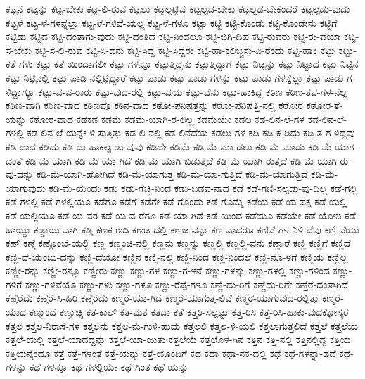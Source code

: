 {ಕಟ್ಟನೆ
ಕಟ್ಟನ್ನು
ಕಟ್ಟ-ಬೇಕು
ಕಟ್ಟ-ಲಿ-ರುವ
ಕಟ್ಟಲು
ಕಟ್ಟಲ್ಪಟ್ಟಿವೆ
ಕಟ್ಟಲ್ಪಡ-ಬೇಕು
ಕಟ್ಟಲ್ಪಡ-ಬೇಕೆಂದರೆ
ಕಟ್ಟಲ್ಪಡು-ವುದು
ಕಟ್ಟಳೆ
ಕಟ್ಟ-ಳೆ-ಗಳನ್ನೆಲ್ಲಾ
ಕಟ್ಟ-ಳೆ-ಗಳಿವೆ-ಯಲ್ಲ
ಕಟ್ಟ-ಳೆ-ಗಳೂ
ಕಟ್ಟಾ
ಕಟ್ಟಿ
ಕಟ್ಟಿ-ಕೊಂಡು
ಕಟ್ಟಿ-ಕೊಂಡೇನು
ಕಟ್ಟಿಗೆ
ಕಟ್ಟಿಡು
ಕಟ್ಟಿದ
ಕಟ್ಟಿ-ದಂತಾಗು-ವುದು
ಕಟ್ಟಿ-ದಂತಿದೆ
ಕಟ್ಟಿ-ನಿಂದಲೂ
ಕಟ್ಟಿ-ಬಿಗಿ-ದಿಹ
ಕಟ್ಟಿ-ರುವರು
ಕಟ್ಟಿ-ರು-ವೆಯಾ
ಕಟ್ಟಿ-ಸ-ಬೇಕು
ಕಟ್ಟಿ-ಸ-ಲಿ-ರುವ
ಕಟ್ಟಿ-ಸಿ-ದನು
ಕಟ್ಟಿ-ಸಿದ್ದ
ಕಟ್ಟಿ-ಸಿದ್ದರು
ಕಟ್ಟಿ-ಹಾ-ಕಲಿಚ್ಚಿಸು-ವಿ-ರೆಂದು
ಕಟ್ಟಿ-ಹಾಕಿ
ಕಟ್ಟು
ಕಟ್ಟು-ಕತೆ-ಗಳು
ಕಟ್ಟು-ಕತೆ-ಯಿಂದಾಗಲೀ
ಕಟ್ಟು-ಗಳನ್ನೂ
ಕಟ್ಟುತ್ತಿದ್ದನು
ಕಟ್ಟುತ್ತಿದ್ದಾಗ
ಕಟ್ಟು-ನಿಟ್ಟನ್ನು
ಕಟ್ಟು-ನಿಟ್ಟಾದ
ಕಟ್ಟು-ನಿಟ್ಟಿನ
ಕಟ್ಟು-ನಿಟ್ಟಿನಲ್ಲಿ
ಕಟ್ಟು-ಪಾಡಿ-ನಲ್ಲಿಟ್ಟಿದ್ದಾರೆ
ಕಟ್ಟು-ಪಾಡು
ಕಟ್ಟು-ಪಾಡು-ಗಳನ್ನು
ಕಟ್ಟು-ಪಾಡು-ಗಳನ್ನೆಲ್ಲಾ
ಕಟ್ಟು-ಪಾಡು-ಗ-ಳಿದ್ದಾಗ್ಯೂ
ಕಟ್ಟು-ವ-ವ-ರಾರು
ಕಟ್ಟು-ವುದ-ರಲ್ಲಿ
ಕಟ್ಟು-ವುದು
ಕಟ್ಟು-ವೆನು
ಕಟ್ಟು-ಹಾಕಿದ್ದ
ಕಠಿಣ
ಕಠಿಣ-ತಪ-ಗಳ-ನೆಲ್ಲ
ಕಠಿಣ-ವಾಗಿ
ಕಠಿಣ-ವಾದ
ಕಠಿಣವೊ
ಕಠಿನ-ವಾದ
ಕಠೋ-ಪನಿಷತ್ತನ್ನು
ಕಠೋ-ಪನಿಷತ್ತಿ-ನಲ್ಲಿ
ಕಠೋರ
ಕಠೋರ-ತೆ-ಯನ್ನು
ಕಠೋರ-ವಾದ
ಕಡಕಡ
ಕಡಮೆ
ಕಡಮೆ-ಯಾಗಿ-ರ-ಲಿಲ್ಲ
ಕಡಮೆಯೇ
ಕಡಲ
ಕಡ-ಲಿನ-ಲೆ-ಗಳ
ಕಡ-ಲಿನ-ಲೆ-ಗಳಲ್ಲಿ
ಕಡ-ಲಿನ-ಲೆ-ಯನ್ನೇ-ಳಿ-ಸುತ್ತಿತ್ತು
ಕಡ-ಲಿ-ನಲ್ಲಿ
ಕಡ-ಲಿನೆದೆಯ
ಕಡಲು-ಗಳ
ಕಡಿ
ಕಡಿ-ಕ-ಡಿದು
ಕಡಿ-ತ-ಗ-ಳಿದ್ದವು
ಕಡಿ-ದಾದ
ಕಡಿದು
ಕಡಿ-ದು-ಹಾಕಲ್ಪ-ಡು-ವುವು
ಕಡಿದೇ
ಕಡಿಮೆ
ಕಡಿ-ಮೆ-ಮಾ-ಡಲು
ಕಡಿ-ಮೆ-ಮಾಡು
ಕಡಿ-ಮೆ-ಯಾಗ-ದಂತೆ
ಕಡಿ-ಮೆ-ಯಾಗಿ
ಕಡಿ-ಮೆ-ಯಾ-ಗಿದೆ
ಕಡಿ-ಮೆ-ಯಾಗಿ-ಬಿಡುತ್ತದೆ
ಕಡಿ-ಮೆ-ಯಾಗಿ-ರುತ್ತದೆ
ಕಡಿ-ಮೆ-ಯಾಗಿ-ರು-ವು-ದನ್ನು
ಕಡಿ-ಮೆ-ಯಾಗಿ-ಹೋಗಿದೆ
ಕಡಿ-ಮೆ-ಯಾಗುತ್ತ
ಕಡಿ-ಮೆ-ಯಾ-ಗುತ್ತಿದೆ
ಕಡಿ-ಮೆ-ಯಾಗುತ್ತಿವೆ
ಕಡಿ-ಮೆ-ಯಾಗುವುದು
ಕಡಿ-ಮೆ-ಯೆಂದು
ಕಡು
ಕಡು-ಗೆಚ್ಚಿ-ನಿಂದ
ಕಡು-ಬಡವ-ನಾದ
ಕಡೆ
ಕಡೆ-ಗಣಿ-ಸಲ್ಪಡು-ವು-ದಿಲ್ಲ
ಕಡೆ-ಗಲ್ಲಿ
ಕಡೆ-ಗಳಲ್ಲಿ
ಕಡೆ-ಗಳಲ್ಲಿಯೂ
ಕಡೆಗೂ
ಕಡೆಗೆ
ಕಡೆಗೇ
ಕಡೆ-ಗೊಂದು
ಕಡೆ-ಗೊಮ್ಮೆ
ಕಡೆಯ
ಕಡೆ-ಯ-ಪಕ್ಷ
ಕಡೆ-ಯಲ್ಲಿ
ಕಡೆ-ಯಲ್ಲಿಯೂ
ಕಡೆ-ಯ-ವರ
ಕಡೆ-ಯ-ವ-ರೆಗೂ
ಕಡೆ-ಯಾ-ಗಿದೆ
ಕಡೆ-ಯಿಂದ
ಕಡೆಯೂ
ಕಡೆಯೇ
ಕಡೆ-ಯೊಳು
ಕಡೆ-ಹಾಯ್ದು
ಕಡ್ಡಾಯ-ವಾಗಿ
ಕಡ್ಡಿ
ಕಣಕ-ಣದಿ
ಕಣಜ-ದಲ್ಲಿ
ಕಣಜ-ವನ್ನು
ಕಣ-ವಾದರೂ
ಕಣಿವೆ-ಗಳ-ನಿಳಿ-ದೆವು
ಕಣಿ-ವೆಯು
ಕಣ್
ಕಣ್ಗೆ
ಕಣ್ಗೊಂಬೆ-ಯಲ್ಲಿ
ಕಣ್ಣ
ಕಣ್ಣಂಚಿ-ನಲ್ಲಿ
ಕಣ್ಣನು
ಕಣ್ಣನ್ನು
ಕಣ್ಣಲ್ಲಿ
ಕಣ್ಣಲ್ಲಿ-ವನು
ಕಣ್ಣಾರೆ
ಕಣ್ಣಿ
ಕಣ್ಣಿಗೆ
ಕಣ್ಣಿದೆ
ಕಣ್ಣಿ-ದೆ-ಯೆಂಬು-ದನ್ನು
ಕಣ್ಣಿ-ದೆಯೋ
ಕಣ್ಣಿನ
ಕಣ್ಣಿ-ನಲ್ಲಿ
ಕಣ್ಣಿ-ನಿಂದ
ಕಣ್ಣಿ-ನಿಂದಲೆ
ಕಣ್ಣಿ-ನೊ-ಳಗೆ
ಕಣ್ಣಿಯೆ
ಕಣ್ಣಿಲ್ಲ
ಕಣ್ಣೀ-ರನ್ನು
ಕಣ್ಣೀ-ರನ್ನೂ
ಕಣ್ಣೀರು
ಕಣ್ಣು
ಕಣ್ಣು-ಗಳ
ಕಣ್ಣು-ಗ-ಳನೆ
ಕಣ್ಣು-ಗಳನ್ನು
ಕಣ್ಣು-ಗಳಲ್ಲಿ
ಕಣ್ಣು-ಗಳಿಂದ
ಕಣ್ಣು-ಗಳಿಗೆ
ಕಣ್ಣು-ಗಳಿವೆಯೊ
ಕಣ್ಣು-ಗಳು
ಕಣ್ಣು-ಗಳೂ
ಕಣ್ಣು-ರೆಪ್ಪೆ-ಗಳೂ
ಕಣ್ಣೆ-ದು-ರಿಗೆ
ಕಣ್ಣೆದು-ರಿಗೇ
ಕಣ್ತೆರೆ-ದಂತಾಗಿದೆ
ಕಣ್ತೆರೆದು
ಕಣ್ತೆರೆ-ಸಿ-ಹಿರಿ
ಕಣ್ದೆರೆದು
ಕಣ್ಮರೆ-ಯಾ-ಗಿದೆ
ಕಣ್ಮರೆ-ಯಾಗುತ್ತ-ಲಿವೆ
ಕಣ್ಮರೆ-ಯಾಗುವುದ-ರಲ್ಲಿತ್ತು
ಕಣ್ಮರೆ-ಯಾದ
ಕಣ್ಮುಂದೆ
ಕಣ್ಮುಚ್ಚಿ
ಕತ-ಕಾಲ್
ಕತ-ಮತ
ಕತವಾ
ಕತೆ
ಕತ್ತರಿ-ಸಲ್ಪಟ್ಟು
ಕತ್ತ-ರಿಸಿ
ಕತ್ತ-ರಿಸಿ-ಹಾಕು-ವುದಕ್ಕೋಸ್ಕರ
ಕತ್ತಲ
ಕತ್ತಲ-ನಿರಾಸೆ-ಗಳ
ಕತ್ತಲನು
ಕತ್ತಲ-ನು-ಗುಳಿ-ಹುದು
ಕತ್ತಲಲಿ
ಕತ್ತಲ-ಳಿ-ಯಲಿ
ಕತ್ತಲಾಗುತ್ತಲಿದೆ
ಕತ್ತಲೆ
ಕತ್ತಲೆಯ
ಕತ್ತಲೆ-ಯಲ್ಲಿ
ಕತ್ತಲೆ-ಯಾದದ್ದನ್ನು
ಕತ್ತಲೆ-ಯಾ-ಯಿತು
ಕತ್ತಲೆಯೆ
ಕತ್ತಲೊಳ-ಗಿನ
ಕತ್ತಿನ
ಕತ್ತಿ-ನಲ್ಲಿ
ಕತ್ತಿನಲ್ಲಿದ್ದ
ಕತ್ತಿಯ
ಕತ್ತಿಯನ್ನೆಂದೂ
ಕತ್ತೆ
ಕತ್ತೆ-ಗಳಂತೆ
ಕತ್ತೆ-ಯನ್ನು
ಕತ್ತೆ-ಯೊಂದಿಗೆ
ಕಥ
ಕಥಾ
ಕಥಾ-ನಕ-ದಲ್ಲಿ
ಕಥೆ
ಕಥೆ-ಗಳನ್ನಾ-ಡದೆ
ಕಥೆ-ಗಳನ್ನು
ಕಥೆ-ಗಳನ್ನೂ
ಕಥೆ-ಗಳಲ್ಲಿಯೇ
ಕಥೆ-ಗಿಂತ
ಕಥೆ-ಯನ್ನು
}
